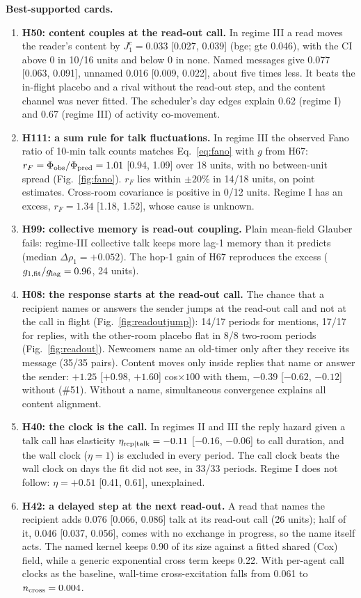 \textbf{Best-supported cards.}
\begin{enumerate}
\item \textbf{H50: content couples at the read-out call.} In regime III a read moves the reader's content by $J^c_1=0.033$ [0.027, 0.039] (bge; gte 0.046), with the CI above 0 in 10/16 units and below 0 in none. Named messages give 0.077 [0.063, 0.091], unnamed 0.016 [0.009, 0.022], about five times less. It beats the in-flight placebo and a rival without the read-out step, and the content channel was never fitted. The scheduler's day edges explain 0.62 (regime I) and 0.67 (regime III) of activity co-movement.
\item \textbf{H111: a sum rule for talk fluctuations.} In regime III the observed Fano ratio of 10-min talk counts matches Eq.~\eqref{eq:fano} with $g$ from H67: $r_F=\Phi_{\rm obs}/\Phi_{\rm pred}=1.01$ [0.94, 1.09] over 18 units, with no between-unit spread (Fig.~\ref{fig:fano}). $r_F$ lies within $\pm20\%$ in 14/18 units, on point estimates. Cross-room covariance is positive in 0/12 units. Regime I has an excess, $r_F=1.34$ [1.18, 1.52], whose cause is unknown.
\item \textbf{H99: collective memory is read-out coupling.} Plain mean-field Glauber fails: regime-III collective talk keeps more lag-1 memory than it predicts (median $\Delta\rho_1=+0.052$). The hop-1 gain of H67 reproduces the excess ($g_{1,\rm fit}/g_{\rm lag}=0.96$, 24 units).
\item \textbf{H08: the response starts at the read-out call.} The chance that a recipient names or answers the sender jumps at the read-out call and not at the call in flight (Fig.~\ref{fig:readoutjump}): 14/17 periods for mentions, 17/17 for replies, with the other-room placebo flat in 8/8 two-room periods (Fig.~\ref{fig:readout}). Newcomers name an old-timer only after they receive its message (35/35 pairs). Content moves only inside replies that name or answer the sender: $+1.25$ [$+0.98$, $+1.60$] cos$\times100$ with them, $-0.39$ [$-0.62$, $-0.12$] without (\#51). Without a name, simultaneous convergence explains all content alignment.
\item \textbf{H40: the clock is the call.} In regimes II and III the reply hazard given a talk call has elasticity $\eta_{\rm rep|talk}=-0.11$ [$-0.16$, $-0.06$] to call duration, and the wall clock ($\eta=1$) is excluded in every period. The call clock beats the wall clock on days the fit did not see, in 33/33 periods. Regime I does not follow: $\eta=+0.51$ [0.41, 0.61], unexplained.
\item \textbf{H42: a delayed step at the next read-out.} A read that names the recipient adds 0.076 [0.066, 0.086] talk at its read-out call (26 units); half of it, 0.046 [0.037, 0.056], comes with no exchange in progress, so the name itself acts. The named kernel keeps 0.90 of its size against a fitted shared (Cox) field, while a generic exponential cross term keeps 0.22. With per-agent call clocks as the baseline, wall-time cross-excitation falls from 0.061 to $n_{\rm cross}=0.004$.
\end{enumerate}

